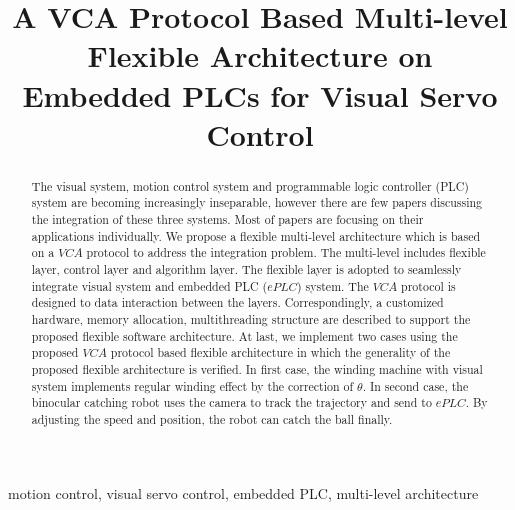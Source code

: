 \documentclass[journal,UTF8]{IEEEtran}
\begin{document}
%
\title{A VCA Protocol Based Multi-level Flexible Architecture on Embedded PLCs for Visual Servo Control }

\maketitle

\begin{abstract}
The visual system, motion control system and programmable logic controller (PLC) system are becoming increasingly inseparable, however there are few papers discussing the integration of these three systems. Most of papers are focusing on their applications individually. We propose a flexible multi-level architecture which is based on a $VCA$ protocol to address the integration problem. The multi-level includes flexible layer, control layer and algorithm layer. The flexible layer is adopted to seamlessly integrate visual system and embedded PLC ($ePLC$) system. The $VCA$ protocol is designed to data interaction between the layers. Correspondingly, a customized hardware, memory allocation, multithreading structure are described to support the proposed flexible software architecture. At last, we implement two cases using the proposed $VCA$ protocol based flexible architecture in which the generality of the proposed flexible architecture is verified. In first case, the winding machine with visual system implements regular winding effect by the correction of $\theta$. In second case, the binocular catching robot uses the camera to track the trajectory and send to $ePLC$. By adjusting the speed and position, the robot can catch the ball finally.
\end{abstract}

\begin{IEEEkeywords}
motion control, visual servo control, embedded PLC, multi-level architecture
\end{IEEEkeywords}

%
\IEEEpeerreviewmaketitle
\end{document}
